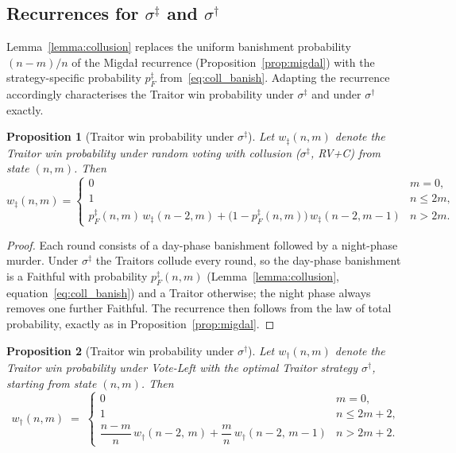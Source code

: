 \documentclass[11pt,a4paper]{article}
\newtheorem{proposition}{Proposition}
\begin{document}
\subsection{Recurrences for \(\sigma^\ddagger\) and \(\sigma^\dagger\)}\label{sec:recurrences}

Lemma~\ref{lemma:collusion} replaces the uniform banishment probability
\((n - m)/n\) of the Migda\l{} recurrence
(Proposition~\ref{prop:migdal}) with the strategy-specific probability
\(p_F^{\ddagger}\) from~\eqref{eq:coll_banish}. Adapting the recurrence
accordingly characterises the Traitor win probability under
\(\sigma^\ddagger\) and under \(\sigma^\dagger\) exactly.

\begin{proposition}[Traitor win probability under \(\sigma^\ddagger\)]\label{prop:rvc}
Let \(w_{\ddagger}(n,m)\) denote the Traitor win probability under random
voting with collusion (\(\sigma^\ddagger\), RV+C) from state \((n, m)\). Then
\begin{equation}\label{eq:rvc}
w_{\ddagger}(n,m)
=
\begin{cases}
0 & m = 0, \\[6pt]
1 & n \leq 2m, \\[6pt]
p_F^{\ddagger}(n,m)\, w_{\ddagger}(n-2,m)
+ \bigl(1 - p_F^{\ddagger}(n,m)\bigr)\, w_{\ddagger}(n-2,m-1)
& n > 2m.
\end{cases}
\end{equation}
\end{proposition}

\begin{proof}
Each round consists of a day-phase banishment followed by a night-phase murder.
Under \(\sigma^\ddagger\) the Traitors collude every round, so the day-phase
banishment is a Faithful with probability \(p_F^{\ddagger}(n,m)\)
(Lemma~\ref{lemma:collusion}, equation~\eqref{eq:coll_banish}) and a Traitor
otherwise; the night phase always removes one further Faithful. The recurrence
then follows from the law of total probability, exactly as in
Proposition~\ref{prop:migdal}.
\end{proof}

\begin{proposition}[Traitor win probability under \(\sigma^\dagger\)]
\label{prop:vlopt}
Let \(w_{\dagger}(n, m)\) denote the Traitor win probability under
Vote-Left with the optimal Traitor strategy \(\sigma^\dagger\), starting
from state \((n, m)\). Then
\begin{equation}\label{eq:vlopt}
w_{\dagger}(n, m) \;=\;
\begin{cases}
0 & m = 0, \\[4pt]
1 & n \leq 2m + 2, \\[4pt]
\dfrac{n - m}{n}\, w_{\dagger}(n - 2,\, m)
 + \dfrac{m}{n}\, w_{\dagger}(n - 2,\, m - 1)
& n > 2m + 2.
\end{cases}
\end{equation}
\end{proposition}
\end{document}
